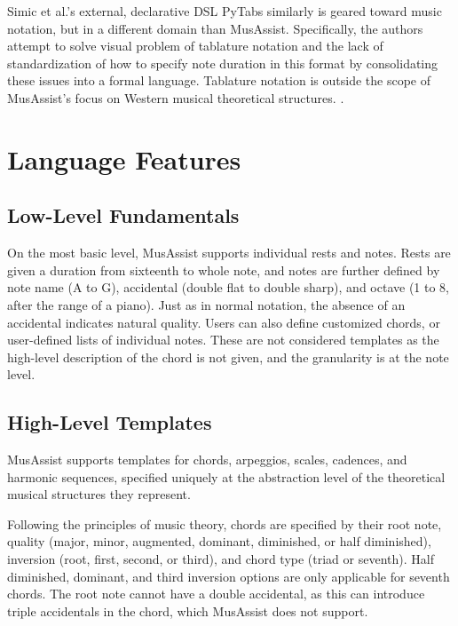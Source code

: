\documentclass{article}
\begin{document}
Simic et al.’s external, declarative DSL PyTabs similarly is geared toward music notation, but in a different domain than MusAssist. Specifically, the authors attempt to solve visual problem of tablature notation and the lack of standardization of how to specify note duration in this format by consolidating these issues into a formal language. Tablature notation is outside the scope of MusAssist’s focus on Western musical theoretical structures. 
 \cite{simic_bal_dejanovic_vaderna}.


\section{Language Features}\label{sec:language_features}
\subsection{Low-Level Fundamentals}
On the most basic level, MusAssist supports individual rests and notes. Rests are given a duration from sixteenth to whole note, and notes are further defined by note name (A to G), accidental (double flat to double sharp), and octave (1 to 8, after the range of a piano). Just as in normal notation, the absence of an accidental indicates natural quality. Users can also define customized chords, or user-defined lists of individual notes. These are not considered templates as the high-level description of the chord is not given, and the granularity is at the note level.

\subsection{High-Level Templates}
MusAssist supports templates for chords, arpeggios, scales, cadences, and harmonic sequences, specified uniquely at the abstraction level of the theoretical musical structures they represent.

Following the principles of music theory, chords are specified by their root note, quality (major, minor, augmented, dominant, diminished, or half diminished), inversion (root, first, second, or third), and chord type (triad or seventh). Half diminished, dominant, and third inversion options are only applicable for seventh chords. The root note cannot have a double accidental, as this can introduce triple accidentals in the chord, which MusAssist does not support.
\end{document}
